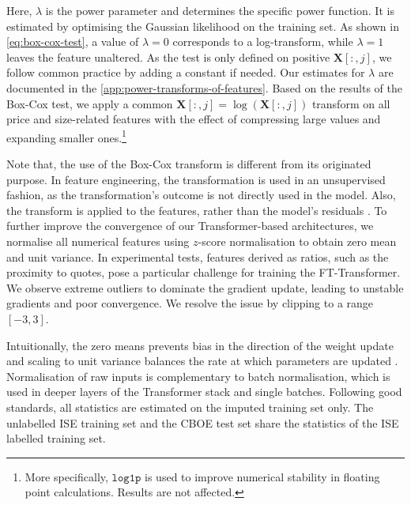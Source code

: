 Here, $\lambda$ is the power parameter and determines the specific power function. It is estimated by optimising the Gaussian likelihood on the training set. As shown in \cref{eq:box-cox-test}, a value of $\lambda=0$ corresponds to a log-transform, while $\lambda=1$ leaves the feature unaltered. As the test is only defined on positive $\mathbf{X}\left[:,j\right]$, we follow common practice by adding a constant if needed. Our estimates for $\lambda$ are documented in the \cref{app:power-transforms-of-features}. Based on the results of the Box-Cox test, we apply a common $\mathbf{X}\left[:,j\right]=\log(\mathbf{X}\left[:,j\right])$ transform on all price and size-related features with the effect of compressing large values and expanding smaller ones.\footnote{More specifically, $\mathtt{log1p}$ is used to improve numerical stability in floating point calculations. Results are not affected.}

Note that, the use of the Box-Cox transform is different from its originated purpose. In feature engineering, the transformation is used in an unsupervised fashion, as the transformation's outcome is not directly used in the model. Also, the transform is applied to the features, rather than the model's residuals \autocite[122]{kuhnFeatureEngineeringSelection2020}.
To further improve the convergence of our Transformer-based architectures, we normalise all numerical features using $z$-score normalisation to obtain zero mean and unit variance.
In experimental tests, features derived as ratios, such as the proximity to quotes, pose a particular challenge for training the FT-Transformer. We observe extreme outliers to dominate the gradient update, leading to unstable gradients and poor convergence. We resolve the issue by clipping to a range $[-3,3]$.

Intuitionally, the zero means prevents bias in the direction of the weight update and scaling to unit variance balances the rate at which parameters are updated \autocite[][8]{lecunEfficientBackProp2012}. Normalisation of raw inputs is complementary to batch normalisation, which is used in deeper layers of the Transformer stack and single batches. Following good standards, all statistics are estimated on the imputed training set only. The unlabelled \gls{ISE} training set and the \gls{CBOE} test set share the statistics of the \gls{ISE} labelled training set.


